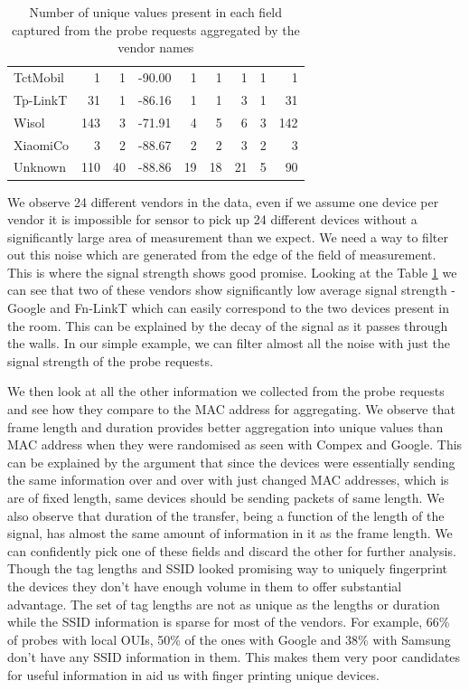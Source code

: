 \begin{table}
\begin{center}
\begin{tabular}{lrrrrrrrr}
  TctMobil &    1 &   1 & -90.00 &   1 &   1 &   1 &   1 &   1 \\ 
  Tp-LinkT &   31 &   1 & -86.16 &   1 &   1 &   3 &   1 &  31 \\ 
  Wisol    &  143 &   3 & -71.91 &   4 &   5 &   6 &   3 & 142 \\ 
  XiaomiCo &    3 &   2 & -88.67 &   2 &   2 &   3 &   2 &   3 \\ 
  Unknown  &  110 &  40 & -88.86 &  19 &  18 &  21 &   5 &  90 \\ 
  \bottomrule
  \end{tabular}
\end{center}
\caption{Number of unique values present in each field captured from the probe requests aggregated by the vendor names}
\label{table:collection:proberequests}
\end{table}

We observe 24 different vendors in the data, even if we assume one device per vendor it is impossible for sensor to pick up 24 different devices without a significantly large area of measurement than we expect.
We need a way to filter out this noise which are generated from the edge of the field of measurement.
This is where the signal strength shows good promise.
Looking at the Table \ref{table:collection:proberequests} we can see that two of these vendors show significantly low average signal strength - Google and Fn-LinkT which can easily correspond to the two devices present in the room.
This can be explained by the decay of the signal as it passes through the walls.
In our simple example, we can filter almost all the noise with just the signal strength of the probe requests.

We then look at all the other information we collected from the probe requests and see how they compare to the MAC address for aggregating.
We observe that frame length and duration provides better aggregation into unique values than MAC address when they were randomised as seen with Compex and Google.
This can be explained by the argument that since the devices were essentially sending the same information over and over with just changed MAC addresses, which is are of fixed length, same devices should be sending packets of same length.
We also observe that duration of the transfer, being a function of the length of the signal, has almost the same amount of information in it as the frame length.
We can confidently pick one of these fields and discard the other for further analysis.
Though the tag lengths and SSID looked promising way to uniquely fingerprint the devices they don't have enough volume in them to offer substantial advantage.
The set of tag lengths are not as unique as the lengths or duration while the SSID information is sparse for most of the vendors.
For example, 66\% of probes with local OUIs, 50\% of the ones with Google and 38\% with Samsung don't have any SSID information in them.
This makes them very poor candidates for useful information in aid us with finger printing unique devices.

